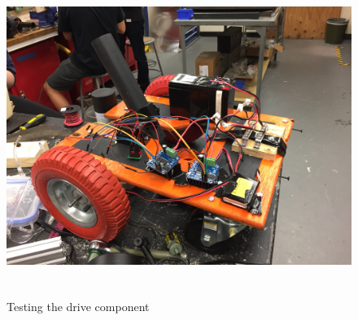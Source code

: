 \documentclass[12pt,letterpaper,titlepage]{article}
\begin{document}
\begin{figure}[H]
	\centering
	\includegraphics[height=3.8in]{images/image1}
	\label{fig:testcircuit}
	\caption{Testing the drive component}
\end{figure}
\end{document}
